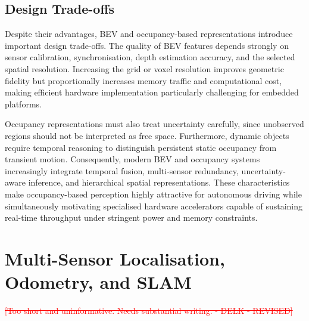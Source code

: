 \documentclass[11pt,oneside,openany]{book}
\newcommand{\added}[1]{\textcolor{RevisionBlue}{#1}}
\newcommand{\deleted}[1]{\textcolor{red}{\sout{#1}}}
\begin{document}
\subsection{Design Trade-offs}

Despite their advantages, BEV and occupancy-based representations introduce important design trade-offs. The quality of BEV features depends strongly on sensor calibration, synchronisation, depth estimation accuracy, and the selected spatial resolution. Increasing the grid or voxel resolution improves geometric fidelity but proportionally increases memory traffic and computational cost, making efficient hardware implementation particularly challenging for embedded platforms.

Occupancy representations must also treat uncertainty carefully, since unobserved regions should not be interpreted as free space. Furthermore, dynamic objects require temporal reasoning to distinguish persistent static occupancy from transient motion. Consequently, modern BEV and occupancy systems increasingly integrate temporal fusion, multi-sensor redundancy, uncertainty-aware inference, and hierarchical spatial representations. These characteristics make occupancy-based perception highly attractive for autonomous driving while simultaneously motivating specialised hardware accelerators capable of sustaining real-time throughput under stringent power and memory constraints.

\section{Multi-Sensor Localisation, Odometry, and SLAM}
\deleted{[Too short and uninformative. Needs substantial writing. - DELK - REVISED]}

\end{document}
